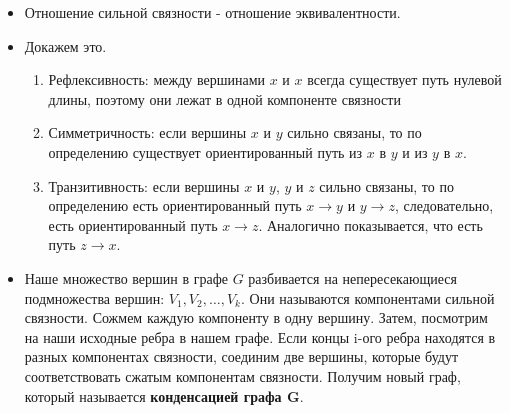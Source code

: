 \begin{itemize}
\item
Отношение сильной связности - отношение эквивалентности.

\item
Докажем это.
\begin{enumerate}
\item Рефлексивность: между вершинами $x$ и $x$ всегда существует путь нулевой длины, поэтому они лежат в одной компоненте связности
\item Симметричность: если вершины $x$ и $y$ сильно связаны, то по определению существует ориентированный путь из $x$ в $y$ и из $y$ в $x$.
\item Транзитивность: если вершины $x$ и $y$, $y$ и $z$ сильно связаны, то по определению есть ориентированный путь $x \to y$ и $y \to z$, следовательно, есть ориентированный путь $x \to z$. Аналогично показывается, что есть путь $z \to x$.
\end{enumerate}

\item
Наше множество вершин в графе $G$ разбивается на непересекающиеся подмножества вершин: $V_1, V_2, \dots, V_k$. Они называются компонентами сильной связности. Сожмем каждую компоненту в одну вершину. Затем, посмотрим на наши исходные ребра в нашем графе. Если концы i-ого ребра находятся в разных компонентах связности, соединим две вершины, которые будут соответствовать сжатым компонентам связности. Получим новый граф, который называется \textbf{конденсацией графа G}.
\end{itemize}

